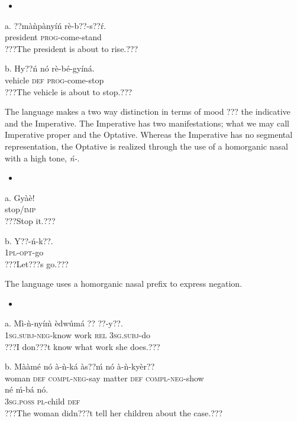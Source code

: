 \documentclass[output=paper]{langsci/langscibook}
\begin{document}
\begin{itemize}
\item \end{itemize}
\gll a.  ??m\`{a}\`{n}p\`{a}ny\'{i}\'{n}  r\`{e}-b??-s??\'{r}.\\
       president  \textsc{prog}{}-come-stand\\
\glt   ???The president is about to rise.???
\z

\gll  b.  Hy??\'{n}    n\'{o}  r\`{e}-b\'{e}-gy\'{i}n\'{a}.\\
       vehicle    \textsc{def}  \textsc{prog}{}-come-stop\\
\glt   ???The vehicle is about to stop.???
\z

The language makes a two way distinction in terms of mood ??? the indicative and the Imperative. The Imperative has two manifestations; what we may call Imperative proper and the Optative. Whereas the Imperative has no segmental representation, the Optative is realized through the use of a homorganic nasal with a high tone, \emph{\'{n}-}. 

\begin{itemize}
\item \end{itemize}
\gll a.  Gy\`{a}\`{e}!\\
       stop/\textsc{imp}\\
\glt   ???Stop it.???
\z

\gll  b.  Y??-\'{n}-k??.\\
       \textsc{1pl}{}-\textsc{opt}{}-go\\
\glt   ???Let???s go.???
\z

The language uses a homorganic nasal prefix to express negation.

\begin{itemize}
\item \end{itemize}
\gll a.  M\`{i}-\`{n}-ny\'{i}\`{m}     \`{e}dw\'{u}m\'{a}  ??   ??{}-y??.\\
       \textsc{1sg.subj}{}-\textsc{neg}{}-know  work    \textsc{rel}  \textsc{3sg.subj}{}-do\\
\glt   ???I don???t know what work she does.???
\z

\gll  b.  M\`{a}\`{a}m\'{e}    n\'{o}  \`{a}-\`{n}-k\'{a}       \`{a}s??\'{m}  n\'{o}  \`{a}-\`{n}-ky\`{e}r??\\
       woman    \textsc{def}  \textsc{compl}{}-\textsc{neg}{}-say  matter  \textsc{def  compl}{}-\textsc{neg}{}-show\\
\gll   n\'{e}    \'{m}-b\'{a}    n\'{o}.\\
       \textsc{3sg.poss}  \textsc{pl}{}-child  \textsc{def}\\
\glt   ???The woman didn???t tell her children about the case.???  
\z
\end{document}
